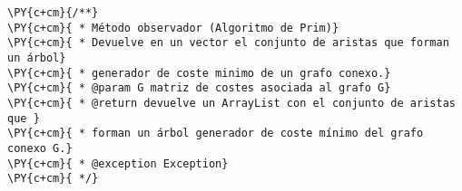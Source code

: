 \begin{Verbatim}[commandchars=\\\{\}]
\PY{c+cm}{/**}
\PY{c+cm}{ * Método observador (Algoritmo de Prim)}
\PY{c+cm}{ * Devuelve en un vector el conjunto de aristas que forman un árbol}
\PY{c+cm}{ * generador de coste minimo de un grafo conexo.}
\PY{c+cm}{ * @param G matriz de costes asociada al grafo G}
\PY{c+cm}{ * @return devuelve un ArrayList con el conjunto de aristas que }
\PY{c+cm}{ * forman un árbol generador de coste mínimo del grafo conexo G.}
\PY{c+cm}{ * @exception Exception}
\PY{c+cm}{ */}
\end{Verbatim}
